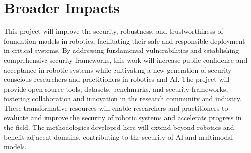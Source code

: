 \documentclass[11pt,letterpaper]{article}
\begin{document}
\section{Broader Impacts}
This project will improve the security, robustness, and trustworthiness of foundation models in robotics, facilitating their safe and responsible deployment in critical systems. By addressing fundamental vulnerabilities and establishing comprehensive security frameworks, this work will increase public confidence and acceptance in robotic systems while cultivating a new generation of security-conscious researchers and practitioners in robotics and AI.
The project will provide open-source tools, datasets, benchmarks, and security frameworks, fostering collaboration and innovation in the research community and industry. These transformative resources will enable researchers and practitioners to evaluate and improve the security of robotic systems and accelerate progress in the field. The methodologies developed here will extend beyond robotics and benefit adjacent domains, contributing to the security of AI and multimodal models.
\end{document}
